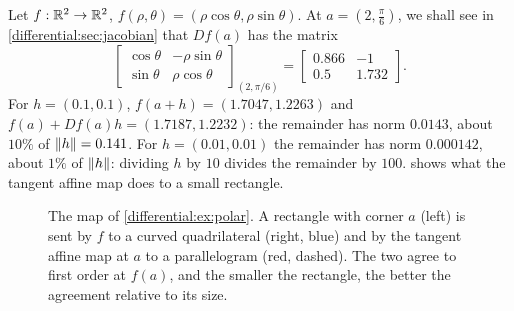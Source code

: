 \begin{notechapter}
\begin{example}\label{differential:ex:polar}
Let $f:\mathbb{R}^2\to\mathbb{R}^2$, $f(\rho, \theta) = (\rho\cos\theta, \rho\sin\theta)$.
At $a = (2, \frac\pi6)$, we shall see in \cref{differential:sec:jacobian}
that $Df(a)$ has the matrix
\[
  \begin{bmatrix}\cos\theta & -\rho\sin\theta\\
                 \sin\theta & \rho\cos\theta\end{bmatrix}_{(2, \pi/6)}
  = \begin{bmatrix}0.866 & -1\\0.5 & 1.732\end{bmatrix} .
\]
For $h = (0.1, 0.1)$, $f(a + h) = (1.7047, 1.2263)$ and
$f(a) + Df(a)h = (1.7187, 1.2232)$: the remainder has norm $0.0143$, about
$10\%$ of $\left\|h\right\| = 0.141$. For $h = (0.01, 0.01)$ the remainder has norm
$0.000142$, about $1\%$ of $\left\|h\right\|$: dividing $h$ by $10$ divides the
remainder by $100$.  shows what the
tangent affine map does to a small rectangle.
\end{example}

\begin{figure}[ht]
\centering
{}
\caption{The map of \cref{differential:ex:polar}. A rectangle with corner
$a$ (left) is sent by $f$ to a curved quadrilateral (right, blue) and by
the tangent affine map at $a$ to a parallelogram (red, dashed). The two
agree to first order at $f(a)$, and the smaller the rectangle, the better
the agreement relative to its size.}
\label{differential:fig:polar}
\end{figure}


\end{notechapter}
